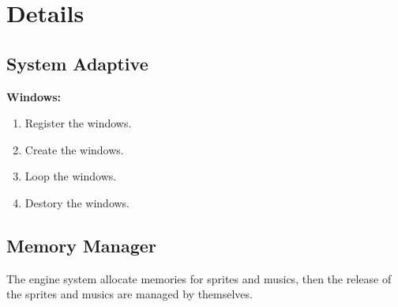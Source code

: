 \section{Details}
\subsection{System Adaptive} \label{subsection:SystemAdaptive}
\textbf{Windows:} \par
\begin{enumerate}
	\item Register the windows.
	\item Create the windows.
	\item Loop the windows.
	\item Destory the windows.
\end{enumerate}

\subsection{Memory Manager}
\hspace*{1.5em}The engine system allocate memories for sprites and musics, then the release of the sprites and musics are managed by themselves.
